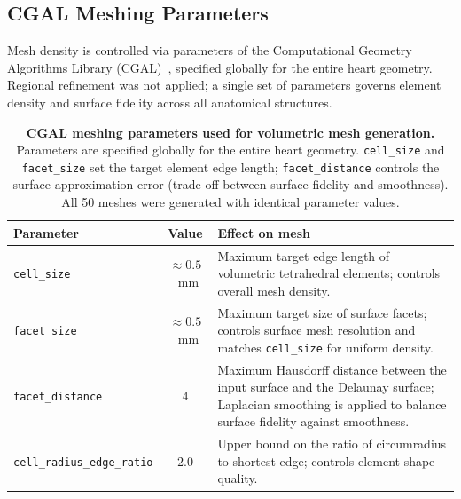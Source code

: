 \subsection*{CGAL Meshing Parameters}

Mesh density is controlled via parameters of the Computational Geometry
Algorithms Library (CGAL)~\cite{cgal}, specified globally for the entire
heart geometry. Regional refinement was not applied; a single set of
parameters governs element density and surface fidelity across all
anatomical structures.

\begin{table}[htbp]
\centering
\caption{
    \textbf{CGAL meshing parameters used for volumetric mesh generation.}
    Parameters are specified globally for the entire heart geometry.
    \texttt{cell\_size} and \texttt{facet\_size} set the target element
    edge length; \texttt{facet\_distance} controls the surface approximation
    error (trade-off between surface fidelity and smoothness).
    All 50 meshes were generated with identical parameter values.
}
\begin{tabular}{lcp{7.5cm}}
\toprule
\textbf{Parameter} & \textbf{Value} & \textbf{Effect on mesh} \\
\midrule
\texttt{cell\_size} & $\approx 0.5$~mm
    & Maximum target edge length of volumetric tetrahedral elements;
      controls overall mesh density. \\
\texttt{facet\_size} & $\approx 0.5$~mm
    & Maximum target size of surface facets; controls surface mesh
      resolution and matches \texttt{cell\_size} for uniform density. \\
\texttt{facet\_distance} & $4$
    & Maximum Hausdorff distance between the input surface and the
      Delaunay surface; Laplacian smoothing is applied to balance
      surface fidelity against smoothness. \\
\texttt{cell\_radius\_edge\_ratio} & $2.0$
    & Upper bound on the ratio of circumradius to shortest edge;
      controls element shape quality. \\
\bottomrule
\end{tabular}
\label{tab:s4-cgal-params}
\end{table}
